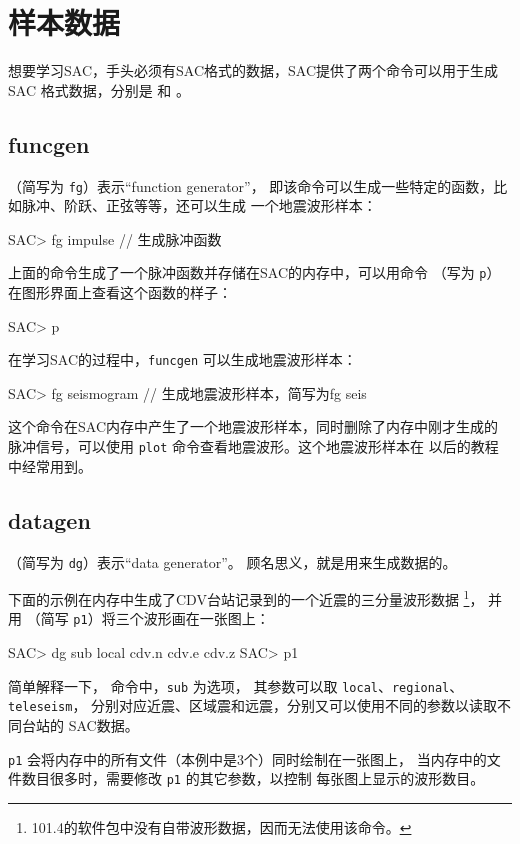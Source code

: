\section{样本数据}
想要学习SAC，手头必须有SAC格式的数据，SAC提供了两个命令可以用于生成SAC
格式数据，分别是  和 。

\subsection{funcgen}
（简写为 \texttt{fg}）表示``function generator''，
即该命令可以生成一些特定的函数，比如脉冲、阶跃、正弦等等，还可以生成
一个地震波形样本：
\begin{SACCode}
SAC> fg impulse         // 生成脉冲函数
\end{SACCode}
上面的命令生成了一个脉冲函数并存储在SAC的内存中，可以用命令
（写为 \texttt{p}）在图形界面上查看这个函数的样子：
\begin{SACCode}
SAC> p
\end{SACCode}

在学习SAC的过程中，\texttt{funcgen} 可以生成地震波形样本：
\begin{SACCode}
SAC> fg seismogram      // 生成地震波形样本，简写为fg seis
\end{SACCode}
这个命令在SAC内存中产生了一个地震波形样本，同时删除了内存中刚才生成的
脉冲信号，可以使用 \texttt{plot} 命令查看地震波形。这个地震波形样本在
以后的教程中经常用到。

\subsection{datagen}
（简写为 \texttt{dg}）表示``data generator''。
顾名思义，就是用来生成数据的。

下面的示例在内存中生成了CDV台站记录到的一个近震的三分量波形数据
\footnote{101.4的软件包中没有自带波形数据，因而无法使用该命令。}，
并用 （简写 \texttt{p1}）将三个波形画在一张图上：
\begin{SACCode}
SAC> dg sub local cdv.n cdv.e cdv.z
SAC> p1
\end{SACCode}
简单解释一下， 命令中，\texttt{sub} 为选项，
其参数可以取 \texttt{local}、\texttt{regional}、\texttt{teleseism}，
分别对应近震、区域震和远震，分别又可以使用不同的参数以读取不同台站的
SAC数据。

\texttt{p1} 会将内存中的所有文件（本例中是3个）同时绘制在一张图上，
当内存中的文件数目很多时，需要修改 \texttt{p1} 的其它参数，以控制
每张图上显示的波形数目。
